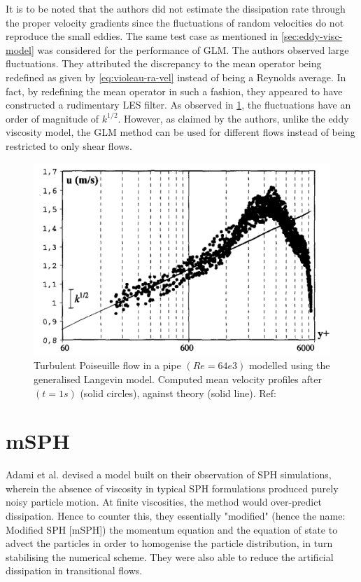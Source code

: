 It is to be noted that the authors did not estimate the dissipation rate through the proper velocity gradients since the fluctuations of random velocities do not reproduce the small eddies.
The same test case as mentioned in \ref{sec:eddy-visc-model} was considered for the performance of GLM. 
The authors observed large fluctuations. They attributed the discrepancy to the mean operator being redefined as given by \ref{eq:violeau-ra-vel} instead of being a Reynolds average. In fact, by redefining the mean operator in such a fashion, they appeared to have constructed a rudimentary LES filter. 
As observed in \ref{fig:violeau2002-GLM-result}, the fluctuations have an order of magnitude of $k^{1/2}$. However, as claimed by the authors, unlike the eddy viscosity model, the GLM method can be used for different flows instead of being restricted to only shear flows.
\begin{figure}[h]
    \centering
    \includegraphics{Figures/research_papers/violeau2002-GLM-result.png}
    \caption{Turbulent Poiseuille flow in a pipe $(Re = 64e3)$ modelled using the generalised Langevin model. Computed mean velocity profiles after $(t=1s)$ (solid circles), against theory (solid line). Ref: \parencite{VIOLEAU2002}}
    \label{fig:violeau2002-GLM-result}
\end{figure}


\section{mSPH}
Adami et al. \parencite{Adami2012} devised a model built on their observation of SPH simulations, wherein the absence of viscosity in typical SPH formulations produced purely noisy particle motion. At finite viscosities, the method would over-predict dissipation. Hence to counter this, they essentially "modified" (hence the name: Modified SPH [mSPH]) the momentum equation and the equation of state to advect the particles in order to homogenise the particle distribution, in turn stabilising the numerical scheme. They were also able to reduce the artificial dissipation in transitional flows.


